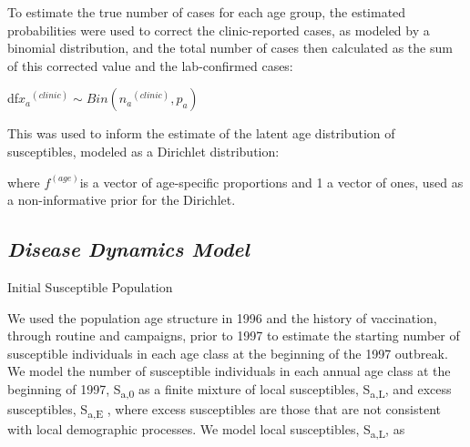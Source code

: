 

To estimate the true number of cases for each age group, the estimated
probabilities were used to correct the clinic-reported cases, as modeled
by a binomial distribution, and the total number of cases then
calculated as the sum of this corrected value and the lab-confirmed
cases:

df\({x_{a}}^{(clinic)} \sim Bin({n_{a}}^{(clinic)},p_{a})\)


This was used to inform the estimate of the latent age distribution of
susceptibles, modeled as a Dirichlet distribution:



where \(f^{(age)}\)is a vector of age-specific proportions and 1 a
vector of ones, used as a non-informative prior for the Dirichlet.

\subsection{\texorpdfstring{\emph{Disease Dynamics
Model}}{Disease Dynamics Model}}\label{disease-dynamics-model}

Initial Susceptible Population

We used the population age structure in 1996 and the history of
vaccination, through routine and campaigns, prior to 1997 to estimate
the starting number of susceptible individuals in each age class at the
beginning of the 1997 outbreak. We model the number of susceptible
individuals in each annual age class at the beginning of 1997,
S\textsubscript{a,0} as a finite mixture of local susceptibles,
S\textsubscript{a,L}, and excess susceptibles, S\textsubscript{a,E} ,
where excess susceptibles are those that are not consistent with local
demographic processes. We model local susceptibles,
S\textsubscript{a,L}, as


